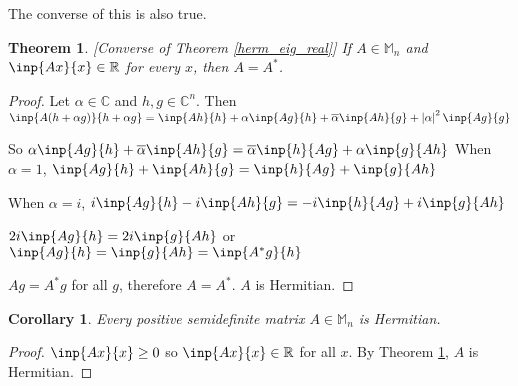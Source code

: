 \documentclass[twofold]{article}
\newcommand*\conj[1]{\overline{#1}}
\newcommand*\adj[1]{#1^*}
\newcommand*\abs[1]{\left \vert #1 \right\vert}
\theoremstyle{plain}
\newtheorem{theorem}{Theorem}
\newtheorem*{corollary}{Corollary}
\theoremstyle{definition}
\theoremstyle{remark}
\begin{document}
The converse of this is also true. 
\begin{theorem}\label{eig_real_herm}  [Converse of Theorem \ref{herm_eig_real}]  If \(A \in \mathbb{M}_n\) and \(\inp{Ax}{x} \in \mathbb{R}\) for every \(x\), then \(A = \adj{A}\). \end{theorem}

\begin{proof} Let \(\alpha \in \mathbb{C}\) and \(h, g \in \mathbb{C}^n\). Then
\(\inp{A(h + \alpha g)}{h + \alpha g} = \inp{Ah}{h} + \alpha \inp{Ag}{h} + \conj{\alpha} \inp{Ah}{g} + \abs{\alpha}^2 \inp{Ag}{g} \)

So \(\alpha \inp{Ag}{h} + \conj{\alpha} \inp{Ah}{g} = \conj{\alpha} \inp{h}{Ag} + \alpha \inp{g}{Ah} \)
When \(\alpha = 1\), \(\inp{Ag}{h} + \inp{Ah}{g} = \inp{h}{Ag} + \inp{g}{Ah}\)\

When \(\alpha = i\), \(i \inp{Ag}{h} - i \inp{Ah}{g} = -i \inp{h}{Ag} + i \inp{g}{Ah}\)

\(2i \inp{Ag}{h} = 2i \inp{g}{Ah}\) or \(\inp{Ag}{h} = \inp{g}{Ah} = \inp{\adj{A}g}{h}\)

\(Ag = \adj{A}g\) for all \(g\), therefore \(A = \adj{A}\). \(A\) is Hermitian.
 \end{proof}

\begin{corollary}Every positive semidefinite matrix \(A \in \mathbb{M}_n\) is Hermitian.\end{corollary}
\begin{proof} \(\inp{Ax}{x} \ge 0 \)  so \(\inp{Ax}{x} \in \mathbb{R}\) for all \(x\). By Theorem \ref{eig_real_herm}, \(A\) is Hermitian. \end{proof}
\end{document}
